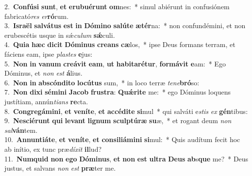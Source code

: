 {2.~}\textbf{Con}\textbf{fú}\textbf{si} \textbf{sunt}, \textbf{et} \textbf{e}\textbf{ru}\textbf{bu}\textbf{é}\textbf{runt} \textbf{om}nes:~* simul abiérunt in confusiónem fabricató\textit{res} \textit{er}\textbf{ró}rum.\\
{3.~}\textbf{Is}\textbf{ra}\textbf{ël} \textbf{sal}\textbf{vá}\textbf{tus} \textbf{est} \textbf{in} \textbf{Dó}\textbf{mi}\textbf{no} \textbf{sa}\textbf{lú}\textbf{te} \textbf{æ}\textbf{tér}na:~* non confundémini, et non erubescétis usque in sǽ\textit{cu}\textit{lum} \textbf{sǽ}culi.\\
{4.~}\textbf{Qui}\textbf{a} \textbf{hæc} \textbf{di}\textbf{cit} \textbf{Dó}\textbf{mi}\textbf{nus} \textbf{cre}\textbf{ans} \textbf{cæ}los,~* ipse Deus formans terram, et fáciens eam, ipse \textit{pla}\textit{stes} \textbf{e}jus:\\
{5.~}\textbf{Non} \textbf{in} \textbf{va}\textbf{num} \textbf{cre}\textbf{á}\textbf{vit} \textbf{e}\textbf{am}, \textbf{ut} \textbf{ha}\textbf{bi}\textbf{ta}\textbf{ré}\textbf{tur}, \textbf{for}\textbf{má}\textbf{vit} \textbf{e}am:~* Ego Dóminus, et \textit{non} \textit{est} \textbf{á}lius.\\
{6.~}\textbf{Non} \textbf{in} \textbf{ab}\textbf{scón}\textbf{di}\textbf{to} \textbf{lo}\textbf{cú}\textbf{tus} sum,~* in loco terræ \textit{te}\textit{ne}\textbf{bró}so:\\
{7.~}\textbf{Non} \textbf{di}\textbf{xi} \textbf{sé}\textbf{mi}\textbf{ni} \textbf{Ja}\textbf{cob} \textbf{fru}\textbf{stra}: \textbf{Quǽ}\textbf{ri}\textbf{te} me:~* ego Dóminus loquens justítiam, annún\textit{ti}\textit{ans} \textbf{re}cta.\\
{8.~}\textbf{Con}\textbf{gre}\textbf{gá}\textbf{mi}\textbf{ni}, \textbf{et} \textbf{ve}\textbf{ní}\textbf{te}, \textbf{et} \textbf{ac}\textbf{cé}\textbf{di}\textbf{te} \textbf{si}mul~* qui salváti e\textit{stis} \textit{ex} \textbf{gén}tibus:\\
{9.~}\textbf{Ne}\textbf{sci}\textbf{é}\textbf{runt} \textbf{qui} \textbf{le}\textbf{vant} \textbf{li}\textbf{gnum} \textbf{scul}\textbf{ptú}\textbf{ræ} \textbf{su}æ,~* et rogant deum \textit{non} \textit{sal}\textbf{ván}tem.\\
{10.~}\textbf{An}\textbf{nun}\textbf{ti}\textbf{á}\textbf{te}, \textbf{et} \textbf{ve}\textbf{ní}\textbf{te}, \textbf{et} \textbf{con}\textbf{si}\textbf{li}\textbf{á}\textbf{mi}\textbf{ni} \textbf{si}mul:~* Quis audítum fecit hoc ab inítio, ex tunc præ\textit{dí}\textit{xit} \textbf{il}lud?\\
{11.~}\textbf{Num}\textbf{quid} \textbf{non} \textbf{e}\textbf{go} \textbf{Dó}\textbf{mi}\textbf{nus}, \textbf{et} \textbf{non} \textbf{est} \textbf{ul}\textbf{tra} \textbf{De}\textbf{us} \textbf{ab}s\textbf{que} me?~* Deus justus, et salvans \textit{non} \textit{est} \textbf{præ}ter me.\\
